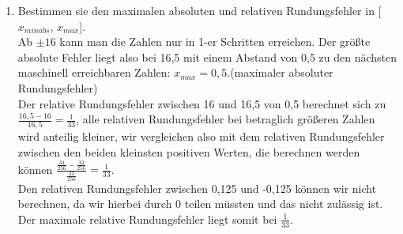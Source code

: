 \documentclass[a4paper]{article}
\begin{document}
\begin{enumerate}[label=(\alph*)]
\begin{figure}[h!]
\end{figure}
    \item Bestimmen sie den maximalen absoluten und relativen Rundungsfehler in [$x_{minabs}$, $x_{max}$].\\
    Ab $\pm 16$ kann man die Zahlen nur in 1-er Schritten erreichen. Der größte absolute Fehler liegt also bei 16,5 mit einem Abstand von 0,5 zu den nächsten maschinell erreichbaren Zahlen: $x_{max}=0,5$.(maximaler absoluter Rundungsfehler)\\
    Der relative Rundungsfehler zwischen 16 und 16,5 von 0,5 berechnet sich zu $\frac{16,5-16}{16,5}=\frac{1}{33}$, alle relativen Rundungsfehler bei betraglich größeren Zahlen wird anteilig kleiner, wir vergleichen also mit dem relativen Rundungsfehler zwischen den beiden kleinsten positiven Werten, die berechnen werden können $\frac{\frac{34}{256}-\frac{33}{256}}{\frac{33}{256}}=\frac{1}{33}$.\\
    Den relativen Rundungsfehler zwischen 0,125 und -0,125 können wir nicht berechnen, da wir hierbei durch 0 teilen müssten und das nicht zulässig ist.\\
    Der maximale relative Rundungsfehler liegt somit bei $\frac{1}{33}$.
    \end{enumerate}
\end{document}
